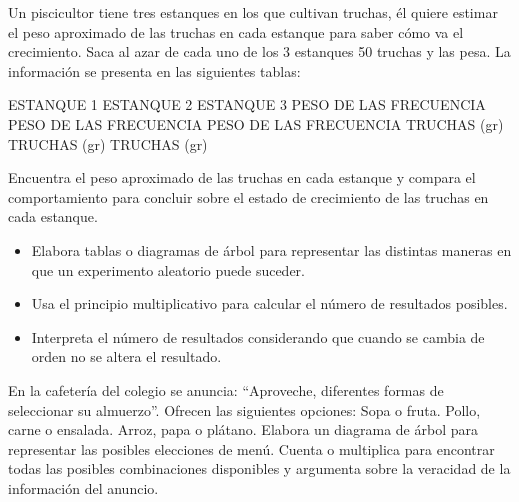 \ejemplo

Un piscicultor tiene tres estanques en los que cultivan truchas, él quiere estimar el peso aproximado de las truchas en cada estanque para saber cómo va el crecimiento. Saca al azar de cada uno de los 3 estanques 50 truchas y las pesa. La información se presenta en las siguientes tablas:

ESTANQUE 1 ESTANQUE 2 ESTANQUE 3 PESO DE LAS FRECUENCIA PESO DE LAS FRECUENCIA PESO DE LAS FRECUENCIA TRUCHAS (gr) TRUCHAS (gr) TRUCHAS (gr)


Encuentra el peso aproximado de las truchas en cada estanque y compara el comportamiento para concluir sobre el estado de crecimiento de las truchas en cada estanque.



\evidencias

\begin{itemize}
  \item Elabora tablas o diagramas de árbol para representar las distintas maneras en que un experimento aleatorio puede suceder.
  \item Usa el principio multiplicativo para calcular el número de resultados posibles.
  \item Interpreta el número de resultados considerando que cuando se cambia de orden no se altera el resultado.
\end{itemize}

\ejemplo


En la cafetería del colegio se anuncia: “Aproveche, diferentes formas de seleccionar su almuerzo”. Ofrecen las siguientes opciones: Sopa o fruta. Pollo, carne o ensalada. Arroz, papa o plátano. Elabora un diagrama de árbol para representar las posibles elecciones de menú. Cuenta o multiplica para encontrar todas las posibles combinaciones disponibles y argumenta sobre la veracidad de la información del anuncio.


